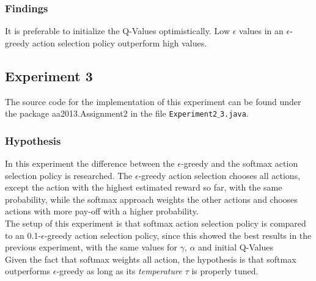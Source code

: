 \documentclass[11pt]{article}
\begin{document}
\subsubsection{Findings}
It is preferable to initialize the Q-Values optimistically. Low $\epsilon$ values in an $\epsilon$-greedy action selection policy outperform high values.

\subsection{Experiment 3}
The source code for the implementation of this experiment can be found under the package aa2013.Assignment2 in the file \texttt{Experiment2$\_$3.java}.
\subsubsection{Hypothesis}
In this experiment the difference between the $\epsilon$-greedy and the softmax action selection policy is researched. The $\epsilon$-greedy action selection chooses all actions, except the action with the highest estimated reward so far, with the same probability, while the softmax approach weights the other actions and chooses actions with more pay-off with a higher probability.\\
The setup of this experiment is that softmax action selection policy is compared to an 0.1-$\epsilon$-greedy action selection policy, since this showed the best results in the previous experiment, with the same values for $\gamma$, $\alpha$ and initial Q-Values\\
Given the fact that softmax weights all action, the hypothesis is that softmax outperforms $\epsilon$-greedy as long as its \emph{temperature $\tau$} is properly tuned.
\end{document}
